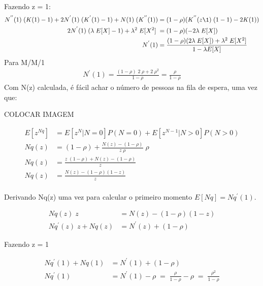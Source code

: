 \documentclass[a4paper]{article}
\begin{document}
\begin{itemize}
\begin{align*}
    \end{align*}
    Fazendo z = 1:
    \begin{align*}
       N^{''}(1)\;(K(1)-1) +2 N^{'}(1)\;(K^{'}(1)-1) +  N(1)\;(K^{''}(1)) &= (1-\rho)(K^{''}(z\1)\;(1-1) - 2K(1))\\ 
       2 N^{'}(1)\;(\lambda\;E[X]-1) + \lambda^2\; E[X^2] \; &= (1-\rho)(- 2\lambda\;E[X])\\ 
       N^{'}(1) &= \frac{(1-\rho)(2\lambda\;E[X])+ \lambda^2\; E[X^2]}{1-\lambda E[X]}
    \end{align*}
    Para M/M/1
    \begin{align*}
      N^{'}(1) = \frac{(1-\rho)\;2\;\rho+ 2\;\rho^2 }{1-\rho} = \frac{\rho}{1-\rho}
    \end{align*}
    Com N(z) calculada, é fácil achar o número de pessoas na fila de espera, uma vez que:
    \begin{center}
        COLOCAR IMAGEM
    \end{center}
    \begin{center}
         \begin{align*}
            E[z^{Nq}] &= E[z^{N}| N = 0]P(N = 0) + E[z^{N-1} | N>0]P(N>0)\\
            Nq(z)&=(1-\rho)+ \frac{N(z) -  (1-\rho)}{z\;\rho} \;\rho\\
            Nq(z)&=\frac{z\;(1-\rho) + N(z) -  (1-\rho)}{z} \;\\
            Nq(z)&=\frac{N(z) -  (1-\rho)(1-z)}{z} \;\\
         \end{align*}
    \end{center}
    Derivando Nq(z) uma vez para calcular o primeiro momento \(E[Nq] = Nq^{'}(1)\).
    \begin{center}
         \begin{align*}
            Nq(z)\;z&=N(z) -  (1-\rho)(1-z)\\
            Nq^{'}(z)\;z + Nq(z)&=N^{'}(z) + (1-\rho)
         \end{align*}
    \end{center}
    Fazendo z = 1 
    \begin{center}
         \begin{align*}
            Nq^{'}(1) + Nq(1)&=N^{'}(1) + (1-\rho)\\
            Nq^{'}(1) &=N^{'}(1) -\rho \;=\; \frac{\rho}{1-\rho} -\rho \;=\;  \frac{\rho^2}{1-\rho}
         \end{align*}
    \end{center}
\end{itemize}
\end{document}
